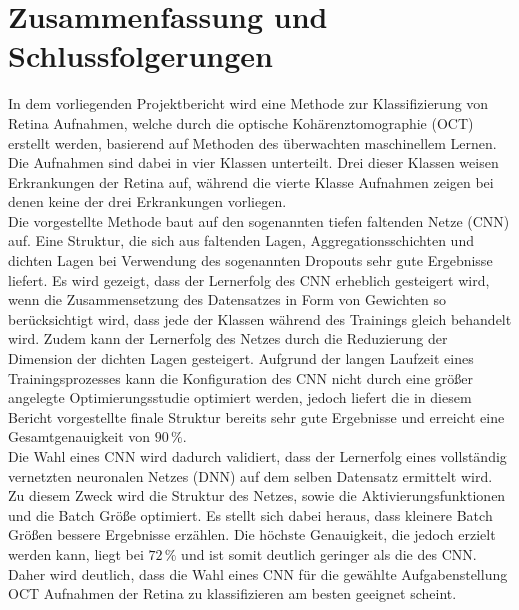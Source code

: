 \section{Zusammenfassung und Schlussfolgerungen}

In dem vorliegenden Projektbericht wird eine Methode zur Klassifizierung von Retina Aufnahmen, welche durch die optische Kohärenztomographie (OCT) erstellt werden, basierend auf Methoden des überwachten maschinellem Lernen. Die Aufnahmen sind dabei in vier Klassen unterteilt. Drei dieser Klassen weisen Erkrankungen der Retina auf, während die vierte Klasse Aufnahmen zeigen bei denen keine der drei Erkrankungen vorliegen. \\
Die vorgestellte Methode baut auf den sogenannten tiefen faltenden Netze (CNN) auf. Eine Struktur, die sich aus faltenden Lagen, Aggregationsschichten und dichten Lagen bei Verwendung des sogenannten Dropouts sehr gute Ergebnisse liefert. Es wird gezeigt, dass der Lernerfolg des CNN erheblich gesteigert wird, wenn die Zusammensetzung des Datensatzes in Form von Gewichten so berücksichtigt wird, dass jede der Klassen während des Trainings gleich behandelt wird. Zudem kann der Lernerfolg des Netzes durch die Reduzierung der Dimension der dichten Lagen gesteigert. Aufgrund der langen Laufzeit eines Trainingsprozesses kann die Konfiguration des CNN nicht durch eine größer angelegte Optimierungsstudie optimiert werden, jedoch liefert die in diesem Bericht vorgestellte finale Struktur bereits sehr gute Ergebnisse und erreicht eine Gesamtgenauigkeit von $90\,\%$.  \\
Die Wahl eines CNN wird dadurch validiert, dass der Lernerfolg eines vollständig vernetzten neuronalen Netzes (DNN) auf dem selben Datensatz ermittelt wird. Zu diesem Zweck wird die Struktur des Netzes, sowie die Aktivierungsfunktionen und die Batch Größe optimiert. Es stellt sich dabei heraus, dass kleinere Batch Größen bessere Ergebnisse erzählen. Die höchste Genauigkeit, die jedoch erzielt werden kann, liegt bei $72\,\%$ und ist somit deutlich geringer als die des CNN. Daher wird deutlich, dass die Wahl eines CNN für die gewählte Aufgabenstellung OCT Aufnahmen der Retina zu klassifizieren am besten geeignet scheint. \\
